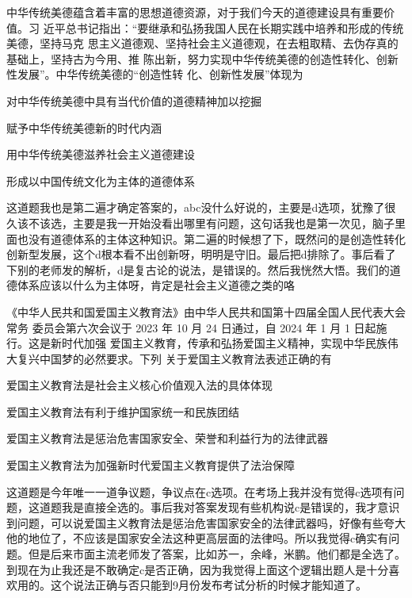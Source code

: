 \documentclass[lang=cn,newtx,10pt,scheme=chinese,pad,twocol]{zznote}
\begin{document}
\begin{exercise}中华传统美德蕴含着丰富的思想道德资源，对于我们今天的道德建设具有重要价值。习 近平总书记指出：“要继承和弘扬我国人民在长期实践中培养和形成的传统美德，坚持马克 思主义道德观、坚持社会主义道德观，在去粗取精、去伪存真的基础上，坚持古为今用、推 陈出新，努力实现中华传统美德的创造性转化、创新性发展”。中华传统美德的“创造性转 化、创新性发展”体现为
	\begin{choice}
		\item 对中华传统美德中具有当代价值的道德精神加以挖掘
		\item 赋予中华传统美德新的时代内涵
		\item 用中华传统美德滋养社会主义道德建设
		\item 形成以中国传统文化为主体的道德体系
	\end{choice}
\end{exercise}
\begin{solution}
	这道题我也是第二遍才确定答案的，abc没什么好说的，主要是d选项，犹豫了很久该不该选，主要是我一开始没看出哪里有问题，这句话我也是第一次见，脑子里面也没有道德体系的主体这种知识。第二遍的时候想了下，既然问的是创造性转化创新型发展，这个d根本看不出创新呀，明明是守旧。最后把d排除了。事后看了下别的老师发的解析，d是复古论的说法，是错误的。然后我恍然大悟。我们的道德体系应该以什么为主体呀，肯定是社会主义道德之类的咯~
\end{solution}


\begin{exercise} 《中华人民共和国爱国主义教育法》由中华人民共和国第十四届全国人民代表大会常务 委员会第六次会议于 2023 年 10 月 24 日通过，自 2024 年 1 月 1 日起施行。这是新时代加强 爱国主义教育，传承和弘扬爱国主义精神，实现中华民族伟大复兴中国梦的必然要求。下列 关于爱国主义教育法表述正确的有
	\begin{choice}
		\item 爱国主义教育法是社会主义核心价值观入法的具体体现
		\item 爱国主义教育法有利于维护国家统一和民族团结
		\item 爱国主义教育法是惩治危害国家安全、荣誉和利益行为的法律武器
		\item 爱国主义教育法为加强新时代爱国主义教育提供了法治保障
	\end{choice}
\end{exercise}
\begin{solution}
	这道题是今年唯一一道争议题，争议点在c选项。在考场上我并没有觉得c选项有问题，这道题我是直接全选的。事后我对答案发现有些机构说c是错误的，我才意识到问题，可以说爱国主义教育法是惩治危害国家安全的法律武器吗，好像有些夸大他的地位了，不应该是国家安全法这种更高层面的法律吗。所以我觉得c确实有问题。但是后来市面主流老师发了答案，比如苏一，余峰，米鹏。他们都是全选了。到现在为止我还是不敢确定c是否正确，因为我觉得上面这个逻辑出题人是十分喜欢用的。这个说法正确与否只能到9月份发布考试分析的时候才能知道了。
\end{solution}
\begin{note}

\end{note}
\end{document}
